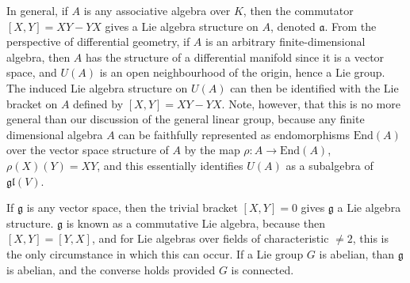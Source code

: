\begin{example}
    In general, if $A$ is any associative algebra over $K$, then the commutator $[X,Y] = XY - YX$ gives a Lie algebra structure on $A$, denoted $\mathfrak{a}$. From the perspective of differential geometry, if $A$ is an arbitrary finite-dimensional algebra, then $A$ has the structure of a differential manifold since it is a vector space, and $U(A)$ is an open neighbourhood of the origin, hence a Lie group. The induced Lie algebra structure on $U(A)$ can then be identified with the Lie bracket on $A$ defined by $[X,Y] = XY - YX$. Note, however, that this is no more general than our discussion of the general linear group, because any finite dimensional algebra $A$ can be faithfully represented as endomorphisms $\text{End}(A)$ over the vector space structure of $A$ by the map $\rho: A \to \text{End}(A)$, $\rho(X)(Y) = XY$, and this essentially identifies $U(A)$ as a subalgebra of $\mathfrak{gl}(V)$.
\end{example}

\begin{example}
    If $\mathfrak{g}$ is any vector space, then the trivial bracket $[X,Y] = 0$ gives $\mathfrak{g}$ a Lie algebra structure. $\mathfrak{g}$ is known as a commutative Lie algebra, because then $[X,Y] = [Y,X]$, and for Lie algebras over fields of characteristic $\neq 2$, this is the only circumstance in which this can occur. If a Lie group $G$ is abelian, than $\mathfrak{g}$ is abelian, and the converse holds provided $G$ is connected.
\end{example}

